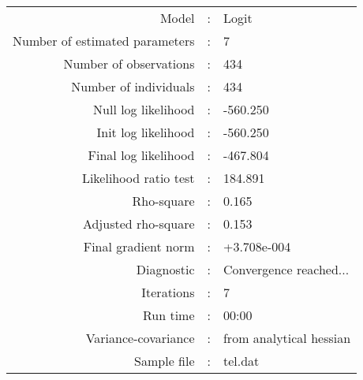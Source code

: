 

\begin{flushleft}
\begin{tabular}{rcl}
\hline
Model &:& Logit\\
Number of estimated parameters&:&7\\
Number of  observations &:& 434\\
Number of individuals&:&434\\
Null log likelihood&:&-560.250\\
Init log likelihood&:&-560.250\\
Final log likelihood&:&-467.804\\
Likelihood ratio test &:&184.891\\
Rho-square&:&0.165\\
Adjusted rho-square&:&0.153\\
Final gradient norm&:&+3.708e-004\\
Diagnostic&:&Convergence reached...\\
Iterations&:&7\\
Run time&:&00:00\\
Variance-covariance&:&from analytical hessian
\\
Sample file&:&tel.dat\\
\end{tabular}
\end{flushleft}
